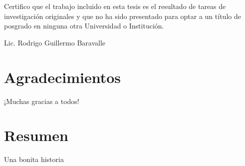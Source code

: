 \documentclass[spanish,a4paper,openany,oneside,10pt]{book}
\begin{document}
 \cleardoublepage


Certifico que el trabajo incluido en esta tesis es el resultado de tareas de investigación
originales y que no ha sido presentado para optar a un título de posgrado en ninguna otra
Universidad o Institución.

\vspace{3cm}
\begin{flushright}
Lic. Rodrigo Guillermo Baravalle
\end{flushright}
\cleardoublepage


\chapter*{Agradecimientos} %
 
¡Muchas gracias a todos!

\chapter*{Resumen} %

Una bonita historia

\printglossary[type=\acronymtype,style=long3col, title=Acrónimos]

\tableofcontents %

\cleardoublepage
{} %
\listoffigures %

\cleardoublepage
{} %
\listoftables %



\newpage

 \cleardoublepage
 \cleardoublepage
 \cleardoublepage
 \cleardoublepage
 \cleardoublepage
 \cleardoublepage

\appendix
 \cleardoublepage



\cleardoublepage
{}


\end{document}
